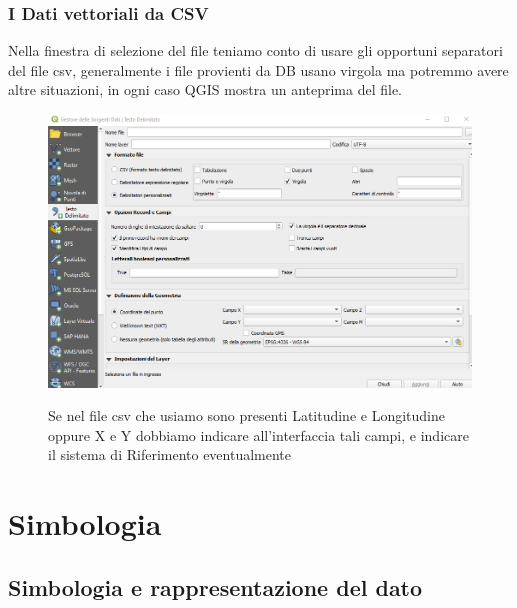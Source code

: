 \documentclass{beamer}
\begin{document}
{\begin{frame}
\begin{itemize}
\begin{figure}
       \end{figure}
   \end{itemize}
   \end{frame}  

\begin{frame}
   \frametitle{I Dati vettoriali da CSV}
   \begin{itemize}
       \item Nella finestra di selezione del file teniamo conto di usare gli opportuni separatori del file csv, generalmente i file provienti da DB usano virgola ma potremmo avere altre situazioni, in ogni caso QGIS mostra un anteprima del file.
       \begin{figure}
           \centering
           \includegraphics[width=0.5\linewidth]{layercsv.png}
        \item Se nel file csv che usiamo sono presenti Latitudine e Longitudine oppure X e Y dobbiamo indicare all'interfaccia tali campi, e indicare il sistema di Riferimento eventualmente
        
           
       \end{figure}
   \end{itemize}
   \end{frame}  




\section{Simbologia}
\subsection{Simbologia e rappresentazione del dato}

}
\end{document}
